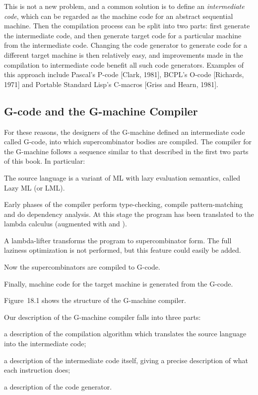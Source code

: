 This is not a new problem, and a common solution is to define an
\textit{intermediate code}, which can be regarded as the machine code for an abstract
sequential machine. Then the compilation process can be split into two parts:
first generate the intermediate code, and then generate target code for a
particular machine from the intermediate code. Changing the code generator
to generate code for a different target machine is then relatively easy, and
improvements made in the compilation to intermediate code benefit all such
code generators. Examples of this approach include Pascal's P-code [Clark,
1981], BCPL's O-code [Richards, 1971] and Portable Standard Lisp's
C-macros [Griss and Hearn, 1981].

\subsection{G-code and the G-machine Compiler}

For these reasons, the designers of the G-machine defined an intermediate
code called G-code, into which supercombinator bodies are compiled. The
compiler for the G-machine follows a sequence similar to that described in the
first two parts of this book. In particular:

\begin{numbered}
    \item The source language is a variant of ML with lazy evaluation semantics,
    called Lazy ML (or LML).
    \item Early phases of the compiler perform type-checking, compile pattern-matching and do dependency analysis. At this stage the program has
    been translated to the lambda calculus (augmented with  and ).
    \item A lambda-lifter transforms the program to supercombinator form. The
    full laziness optimization is not performed, but this feature could easily be
    added.
    \item Now the supercombinators are compiled to G-code.
    \item Finally, machine code for the target machine is generated from the
    G-code.
\end{numbered}

\noindent
Figure~18.1 shows the structure of the G-machine compiler.

Our description of the G-machine compiler falls into three parts:

\begin{numbered}
    \item a description of the compilation algorithm which translates the source
    language into the intermediate code;
    \item a description of the intermediate code itself, giving a precise description
    of what each instruction does;
    \item a description of the code generator.
\end{numbered}


